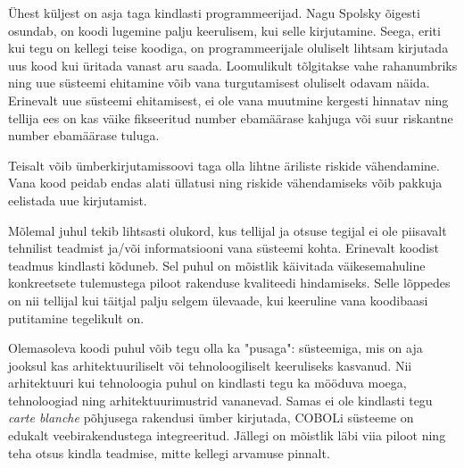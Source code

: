 \documentclass{article}
\begin{document}
Ühest küljest on asja taga kindlasti programmeerijad. Nagu Spolsky õigesti osundab, on koodi lugemine palju keerulisem, kui selle kirjutamine. Seega, eriti kui tegu on kellegi teise koodiga, on programmeerijale oluliselt lihtsam kirjutada uus kood kui üritada vanast aru saada. Loomulikult tõlgitakse vahe rahanumbriks ning uue süsteemi ehitamine võib vana turgutamisest oluliselt odavam näida. Erinevalt uue süsteemi ehitamisest, ei ole vana muutmine kergesti hinnatav ning tellija ees on kas väike fikseeritud number ebamäärase kahjuga või suur riskantne number ebamäärase tuluga. 

Teisalt võib ümberkirjutamissoovi taga olla lihtne äriliste riskide vähendamine. Vana kood peidab endas alati üllatusi ning riskide vähendamiseks võib pakkuja eelistada uue kirjutamist. 

Mõlemal juhul tekib lihtsasti olukord, kus tellijal ja otsuse tegijal ei ole piisavalt tehnilist teadmist ja/või informatsiooni vana süsteemi kohta. Erinevalt koodist teadmus kindlasti kõduneb. Sel puhul on mõistlik käivitada väikesemahuline konkreetsete tulemustega piloot rakenduse kvaliteedi hindamiseks. Selle lõppedes on nii tellijal kui täitjal palju selgem ülevaade, kui keeruline vana koodibaasi putitamine tegelikult on.

Olemasoleva koodi puhul võib tegu olla ka "pusaga": süsteemiga, mis on aja jooksul kas arhitektuuriliselt või tehnoloogiliselt keeruliseks kasvanud. Nii arhitektuuri kui tehnoloogia puhul on kindlasti tegu ka mööduva moega, tehno\-loogiad ning arhitektuurimustrid vananevad. Samas ei ole kindlasti tegu \textit{carte blanche} põhjusega rakendusi ümber kirjutada, COBOLi süsteeme on edukalt veebirakendustega integreeritud. Jällegi on mõistlik läbi viia piloot ning teha otsus kindla teadmise, mitte kellegi arvamuse pinnalt.
\end{document}
